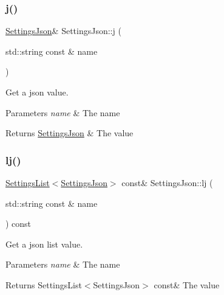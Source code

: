 \subsubsection{\texorpdfstring{j()}{j()}\hspace{0.1cm}{\footnotesize\ttfamily [2/2]}}
{\footnotesize\ttfamily \hyperlink{class_settings_json}{Settings\+Json}\& Settings\+Json\+::j (\begin{DoxyParamCaption}\item[{std\+::string const \&}]{name }\end{DoxyParamCaption})\hspace{0.3cm}{\ttfamily [inline]}}



Get a json value. 


\begin{DoxyParams}{Parameters}
{\em name} & The name \\
\hline
\end{DoxyParams}
\begin{DoxyReturn}{Returns}
\hyperlink{class_settings_json}{Settings\+Json} \& The value 
\end{DoxyReturn}
\mbox{\label{class_settings_json_abf1706f5c417b2733c3d0c815d141524}} 
\subsubsection{\texorpdfstring{lj()}{lj()}\hspace{0.1cm}{\footnotesize\ttfamily [1/2]}}
{\footnotesize\ttfamily \hyperlink{class_settings_list}{Settings\+List}$<$\hyperlink{class_settings_json}{Settings\+Json}$>$ const\& Settings\+Json\+::lj (\begin{DoxyParamCaption}\item[{std\+::string const \&}]{name }\end{DoxyParamCaption}) const\hspace{0.3cm}{\ttfamily [inline]}}



Get a json list value. 


\begin{DoxyParams}{Parameters}
{\em name} & The name \\
\hline
\end{DoxyParams}
\begin{DoxyReturn}{Returns}
Settings\+List$<$\+Settings\+Json$>$ const\& The value 
\end{DoxyReturn}
\mbox{\label{class_settings_json_ac2ae204a71639b25c82563eb49d8edcd}} 
